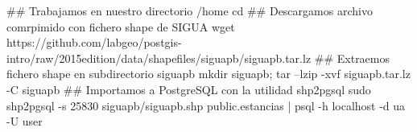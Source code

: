 \lstset{caption=Importación de estancias,label=sql:importarEstancias}
\begin{bash}
## Trabajamos en nuestro directorio /home
cd
## Descargamos archivo comrpimido con fichero shape de SIGUA
wget https://github.com/labgeo/postgis-intro/raw/2015edition/data/shapefiles/siguapb/siguapb.tar.lz
## Extraemos fichero shape en subdirectorio siguapb
mkdir siguapb; tar --lzip -xvf siguapb.tar.lz -C siguapb
## Importamos a PostgreSQL con la utilidad shp2pgsql
sudo shp2pgsql -s 25830 siguapb/siguapb.shp public.estancias  | psql -h localhost -d ua -U user
\end{bash}
